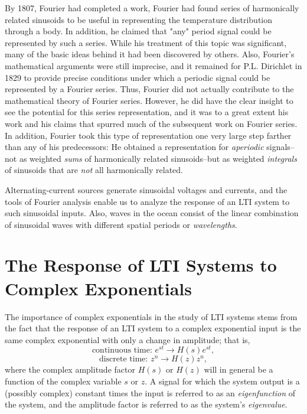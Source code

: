 \documentclass[a4paper,twoside]{book}
\begin{document}
By 1807, Fourier had completed a work, Fourier had found series of harmonically related sinusoids to be useful in representing the temperature distribution through a body. In addition, he claimed that "any" period signal could be represented by such a series. While his treatment of this topic was significant, many of the basic ideas behind it had been discovered by others. Also, Fourier's mathematical arguments were still imprecise, and it remained for P.L. Dirichlet in 1829 to provide precise conditions under which a periodic signal could be represented by a Fourier series. Thus, Fourier did not actually contribute to the mathematical theory of Fourier series. However, he did have the clear insight to see the potential for this series representation, and it was to a great extent his work and his claims that spurred much of the subsequent work on Fourier series. In addition, Fourier took this type of representation one very large step farther than any of his predecessors: He obtained a representation for \textit{aperiodic} signals--not as weighted \textit{sums} of harmonically related sinusoids--but as weighted \textit{integrals} of sinusoids that are \textit{not} all harmonically related.

Alternating-current sources generate sinusoidal voltages and currents, and the tools of Fourier analysis enable us to analyze the response of an LTI system to such sinusoidal inputs. Also, waves in the ocean consist of the linear combination of sinusoidal waves with different spatial periods or \textit{wavelengths}.

\section{The Response of LTI Systems to Complex Exponentials}
\label{section:3.2}

The importance of complex exponentials in the study of LTI systems stems from the fact that the response of an LTI system to a complex exponential input is the same complex exponential with only a change in amplitude; that is,
\begin{equation}
    \text{continuous time: }e^{st}\longrightarrow H(s)e^{st},
    \label{3.1}
\end{equation}
\begin{equation}
    \text{discrete time: }z^n\longrightarrow H(z)z^n,
    \label{3.2}
\end{equation}
where the complex amplitude factor $H(s)$ or $H(z)$ will in general be a function of the complex variable $s$ or $z$. A signal for which the system output is a (possibly complex) constant times the input is referred to as an \textit{eigenfunction} of the system, and the amplitude factor is referred to as the system's \textit{eigenvalue}.
\end{document}
